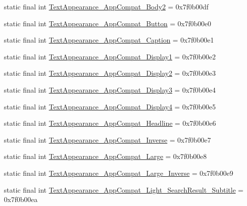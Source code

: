 \begin{CompactItemize}
static final int \hyperlink{classandroid_1_1support_1_1v7_1_1palette_1_1_r_1_1style_479d6efe71fc1f0710b36529c29b8bc9}{TextAppearance\_\-AppCompat\_\-Body2} = 0x7f0b00df
\item 
static final int \hyperlink{classandroid_1_1support_1_1v7_1_1palette_1_1_r_1_1style_819481b5f41926e94ac0555ba572ca5a}{TextAppearance\_\-AppCompat\_\-Button} = 0x7f0b00e0
\item 
static final int \hyperlink{classandroid_1_1support_1_1v7_1_1palette_1_1_r_1_1style_ecd559bb7b3d27c560c93b99aded43b4}{TextAppearance\_\-AppCompat\_\-Caption} = 0x7f0b00e1
\item 
static final int \hyperlink{classandroid_1_1support_1_1v7_1_1palette_1_1_r_1_1style_0abd1b338cee6cd1920da826e15eb172}{TextAppearance\_\-AppCompat\_\-Display1} = 0x7f0b00e2
\item 
static final int \hyperlink{classandroid_1_1support_1_1v7_1_1palette_1_1_r_1_1style_f33abf9544a15093b7ab4aae99c0c6d2}{TextAppearance\_\-AppCompat\_\-Display2} = 0x7f0b00e3
\item 
static final int \hyperlink{classandroid_1_1support_1_1v7_1_1palette_1_1_r_1_1style_e012183606406ee5bbc81de76d3944e7}{TextAppearance\_\-AppCompat\_\-Display3} = 0x7f0b00e4
\item 
static final int \hyperlink{classandroid_1_1support_1_1v7_1_1palette_1_1_r_1_1style_8fb111a034944a4d4d5d7024df8bfa33}{TextAppearance\_\-AppCompat\_\-Display4} = 0x7f0b00e5
\item 
static final int \hyperlink{classandroid_1_1support_1_1v7_1_1palette_1_1_r_1_1style_6487e0b214d453399aa2bfb9d4399967}{TextAppearance\_\-AppCompat\_\-Headline} = 0x7f0b00e6
\item 
static final int \hyperlink{classandroid_1_1support_1_1v7_1_1palette_1_1_r_1_1style_63c6c6e9150c34dd9cfa12e71860c32e}{TextAppearance\_\-AppCompat\_\-Inverse} = 0x7f0b00e7
\item 
static final int \hyperlink{classandroid_1_1support_1_1v7_1_1palette_1_1_r_1_1style_dda0122583f62c8822b8d62d2e75c592}{TextAppearance\_\-AppCompat\_\-Large} = 0x7f0b00e8
\item 
static final int \hyperlink{classandroid_1_1support_1_1v7_1_1palette_1_1_r_1_1style_32d7d4213439364558827767a92e3d38}{TextAppearance\_\-AppCompat\_\-Large\_\-Inverse} = 0x7f0b00e9
\item 
static final int \hyperlink{classandroid_1_1support_1_1v7_1_1palette_1_1_r_1_1style_3fa14c9c7627aa94ca59de1d1196bb74}{TextAppearance\_\-AppCompat\_\-Light\_\-SearchResult\_\-Subtitle} = 0x7f0b00ea

\end{CompactItemize}

